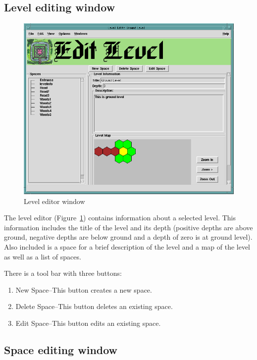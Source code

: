 \subsection{Level editing window}
\label{sect:leveledit}

\begin{figure}[hbpt] 
\begin{centering}
\includegraphics[width=5in]{LevelEditor.png}
\caption{Level editor window}
\label{fig:LevelEditor}
\end{centering}
\end{figure}
The level editor (Figure~\ref{fig:LevelEditor}) contains information
about a selected level.  This information includes the title of the
level and its depth (positive depths are above ground, negative depths are
below ground and a depth of zero is at ground level).  Also included is
a space for a brief description of the level and a map of the level as
well as a list of spaces.

There is a tool bar with three buttons:
\begin{enumerate}
\item New Space--This button creates a new space.
\item Delete Space--This button deletes an existing space.
\item Edit Space--This button edits an existing space.
\end{enumerate}

\subsection{Space editing window}
\label{sect:spaceedit}

